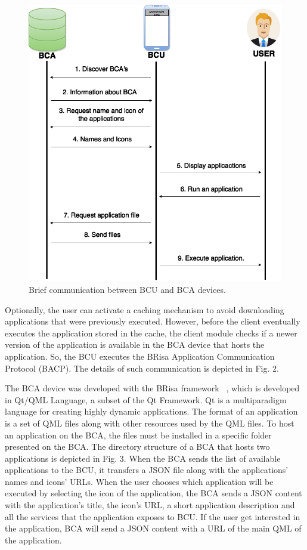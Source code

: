 \documentclass[journal]{IEEEtran}
\begin{document}
\begin{figure}[tb]
    \includegraphics[scale = 0.36]{FIG1}    
    \caption{Brief communication between BCU and BCA devices.}
\end{figure}

Optionally, the user can activate a caching mechanism to avoid downloading applications that were previously executed. However, before the client eventually executes the application stored in the cache, the client module checks if a newer version of the application is available in the BCA device that hosts the application. So, the BCU executes the BRisa Application Communication Protocol (BACP). The details of such communication  is depicted in Fig. 2.

The BCA device was developed with the BRisa framework ~\cite{guedes2008brisa}, which is developed in Qt/QML Language, a subset of the Qt Framework. Qt is a multiparadigm language for creating highly dynamic applications. The format of an application is a set of QML files along with other resources used by the QML files. To host an application on the BCA, the files must be installed in a specific folder presented on the BCA. The directory structure of a BCA that hosts two applications is depicted in Fig. 3. When the BCA sends the list of available applications to the BCU, it transfers a JSON file along with the applications' names and icons' URLs. When the user chooses which application will be executed by selecting the icon of the application, the BCA sends a JSON content with the application's title, the icon's URL, a short application description and all the services that the application exposes to BCU. If the user get interested in the application, BCA will send a JSON content with a URL of the main QML of the application. 
\end{document}
